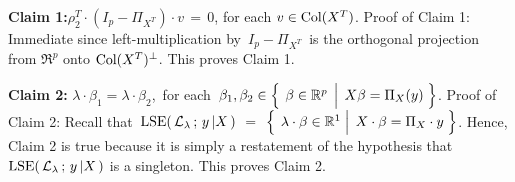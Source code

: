 \vskip 0.5cm
\noindent
\textbf{Claim 1:}\quad $\rho_{2}^{T} \cdot (I_{p} - \Pi_{X^{T}}) \cdot v \,=\, 0$,
for each $v \in \textnormal{Col}(X^{T})$.
\vskip 0.2cm
\noindent
Proof of Claim 1:\quad
Immediate since left-multiplication by \,$I_{p} - \Pi_{X^{T}}$\, is the orthogonal projection
from $\Re^{p}$ onto $\textnormal{Col}(X^{T})^{\perp}$. This proves Claim 1.

\vskip 0.5cm
\noindent
\textbf{Claim 2:}\quad
$\lambda\cdot\beta_{1} = \lambda\cdot\beta_{2}$,\,
for each \,$\beta_{1}, \beta_{2} \in \left\{\;\left.\overset{{\color{white}.}}{\beta} \in \Re^{p} \;\,\right\vert\; X\beta=\Pi_{X}(y) \;\right\}$.
\vskip 0.2cm
\noindent
Proof of Claim 2:\quad
Recall that \,$\textnormal{LSE}\!\left(\,\mathcal{L}_{\lambda}\,;\,y\,\vert X\,\right)$ $=$
$\left\{\;\left.\overset{{\color{white}.}}{\lambda}\cdot\beta\in\Re^{1}\;\right\vert\;X\cdot\beta=\Pi_{X}\cdot y\;\right\}$.
Hence, Claim 2 is true because it is simply a restatement of the hypothesis that
$\textnormal{LSE}\!\left(\,\mathcal{L}_{\lambda}\,;\,y\,\vert X\,\right)$ is a singleton.
This proves Claim 2.

